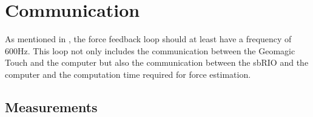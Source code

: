 \chapter{Communication}\label{cha:communication}

As mentioned in , the force feedback loop should at least have a frequency of 600Hz. This loop not only includes the communication between the Geomagic Touch and the computer but also the communication between the sbRIO and the computer and the computation time required for force estimation.











\section{Measurements}



